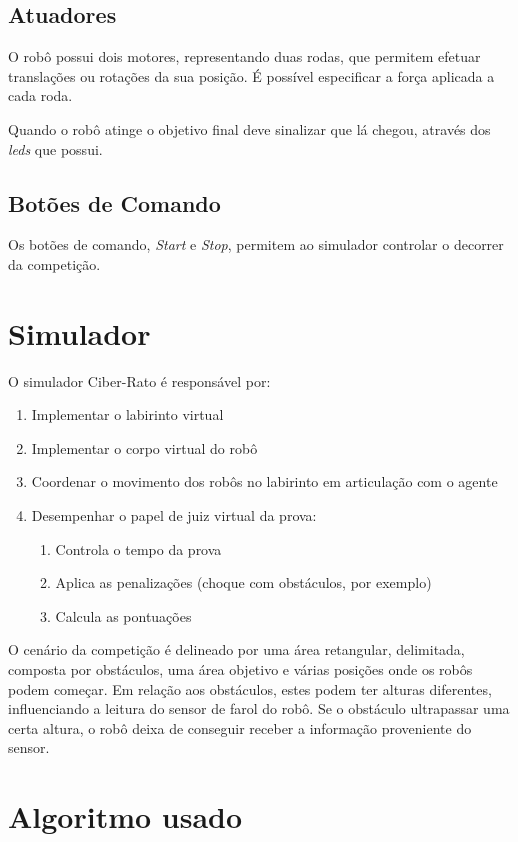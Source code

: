 \documentclass[citeauthoryear]{llncs} %
\begin{document}
\subsection{Atuadores}

O robô possui dois motores, representando duas rodas, que permitem efetuar translações ou rotações da sua posição. É possível especificar a força aplicada a cada roda. 

Quando o robô atinge o objetivo final deve sinalizar que lá chegou, através dos \emph{leds} que possui. 

\subsection{Botões de Comando}
Os botões de comando, \emph{Start} e \emph{Stop}, permitem ao simulador controlar o decorrer da competição.

\section{Simulador}

O simulador Ciber-Rato é responsável por:
\begin{enumerate} 
\item Implementar o labirinto virtual 
\item Implementar o corpo virtual do robô
\item Coordenar o movimento dos robôs no labirinto em articulação com o agente
\item Desempenhar o papel de juiz virtual da prova:
\begin{enumerate} 
\item Controla o tempo da prova
\item Aplica as penalizações (choque com obstáculos, por exemplo)
\item Calcula as pontuações
\end{enumerate}
\end{enumerate}

O cenário da competição é delineado por uma área retangular, delimitada, composta por obstáculos, uma área objetivo e várias posições onde os robôs podem começar. Em relação aos obstáculos, estes podem ter alturas diferentes, influenciando a leitura do sensor de farol do robô. Se o obstáculo ultrapassar uma certa altura, o robô deixa de conseguir receber a informação proveniente do sensor. 

\section{Algoritmo usado}
\end{document}
